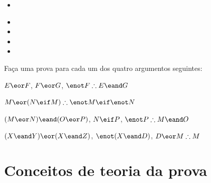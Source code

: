 \begin{itemize}
\item[1.] 
	\begin{fitchproof}
 {}
 {}
\end{fitchproof}

\item[]

\item[2.]
\begin{fitchproof}
\open
\close
{}
\end{fitchproof}

\item[]

\item[3.]
\begin{fitchproof}
\open
	 {}
		\open
	\close
\close
{}
\end{fitchproof}
\end{itemize}

\problempart 
Faça uma prova para cada um dos quatro argumentos seguintes:
\begin{earg}
\item $E\eor F$, $F\eor G$, $\enot F \therefore E \eand G$
\item $M\eor(N\eif M) \therefore \enot M \eif \enot N$
\item $(M \eor N) \eand (O \eor P)$, $N \eif P$, $\enot P \therefore M\eand O$
\item $(X\eand Y)\eor(X\eand Z)$, $\enot(X\eand D)$, $D\eor M \therefore M$
\end{earg}


\chapter{Conceitos de teoria da prova}\label{s:ProofTheoreticConcepts}

